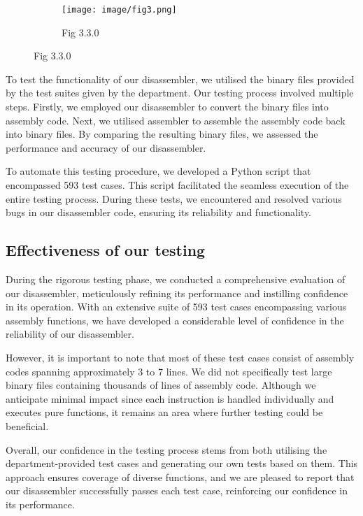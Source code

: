 \documentclass{article}
\begin{document}
\begin{adjustwidth}{2em}{0pt}
            \begin{figure}[h]
            \begin{subfigure} {1.0\linewidth}
                \texttt{[image: image/fig3.png]} 
                \caption{Fig 3.3.0}
            \end{subfigure}
            \end{figure}
        
            To test the functionality of our disassembler, we utilised the binary files provided by the test suites given by the department. Our testing process involved multiple steps. Firstly, we employed our disassembler to convert the binary files into assembly code. Next, we utilised assembler to assemble the assembly code back into binary files. By comparing the resulting binary files, we assessed the performance and accuracy of our disassembler.
        
            To automate this testing procedure, we developed a Python script that encompassed 593 test cases. This script facilitated the seamless execution of the entire testing process. During these tests, we encountered and resolved various bugs in our disassembler code, ensuring its reliability and functionality.
    
     
        \subsection{Effectiveness of our testing}
            During the rigorous testing phase, we conducted a comprehensive evaluation of our disassembler, meticulously refining its performance and instilling confidence in its operation. With an extensive suite of 593 test cases encompassing various assembly functions, we have developed a considerable level of confidence in the reliability of our disassembler.
            
            However, it is important to note that most of these test cases consist of assembly codes spanning approximately 3 to 7 lines. We did not specifically test large binary files containing thousands of lines of assembly code. Although we anticipate minimal impact since each instruction is handled individually and executes pure functions, it remains an area where further testing could be beneficial.
            
            Overall, our confidence in the testing process stems from both utilising the department-provided test cases and generating our own tests based on them. This approach ensures coverage of diverse functions, and we are pleased to report that our disassembler successfully passes each test case, reinforcing our confidence in its performance.

        \end{adjustwidth}
    
\end{document}
